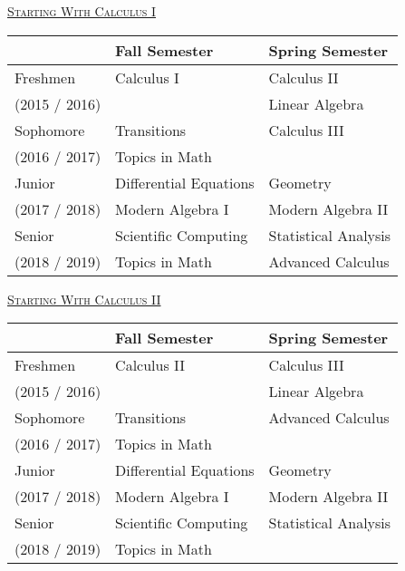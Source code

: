 \documentclass[letterpaper,10pt]{article}
\begin{document}
\begin{center}
\end{center}

\bigskip

\setlength{\extrarowheight}{2pt}
\begin{minipage}[t]{.45\textwidth}
\begin{center}
\underline{\scshape  \Large Starting With Calculus I}
\end{center}

\begin{tabular}{l|l|l}
	&{\bf Fall Semester} & {\bf Spring Semester}\\
\hline
Freshmen & Calculus I & Calculus II \\
\scriptsize (2015 / 2016) & & Linear Algebra\\[2pt]
\hline
Sophomore & Transitions & Calculus III\\
\scriptsize (2016 / 2017) & {\color{gray}Topics in Math} & \\[2pt]
\hline
Junior & Differential Equations & Geometry \\
\scriptsize (2017 / 2018)& Modern Algebra I & Modern Algebra II \\[2pt]
\hline
Senior & Scientific Computing & Statistical Analysis\\
\scriptsize (2018 / 2019) &    {\color{gray}Topics in Math} & Advanced Calculus \\
\end{tabular}
\end{minipage}
\hspace{4em}
\begin{minipage}[t]{.45\textwidth}
\begin{center}
\underline{\scshape  \Large Starting With Calculus II} %
\end{center}

\begin{tabular}{l|l|l}
	&{\bf Fall Semester} & {\bf Spring Semester}\\
\hline
Freshmen & Calculus II & Calculus III \\
\scriptsize (2015 / 2016) &  & Linear Algebra \\[2pt]
\hline
Sophomore & Transitions & Advanced Calculus \\
\scriptsize (2016 / 2017)& {\color{gray}Topics in Math} &\\[2pt]
\hline
Junior & Differential Equations & Geometry \\
\scriptsize (2017 / 2018)& Modern Algebra I & Modern Algebra II\\[2pt]
\hline
Senior & Scientific Computing & Statistical Analysis\\
\scriptsize (2018 / 2019)& {\color{gray}Topics in Math} &
\end{tabular}
\end{minipage}
\end{document}
